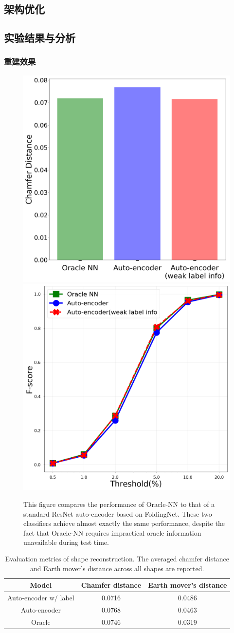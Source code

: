 \documentclass[bachelor, nocolorlinks, printoneside]{seuthesis} %
\begin{document}
\begin{Main}
\subsection{架构优化}
\subsection{实验结果与分析}
\subsubsection{重建效果}
\begin{figure}[!htb]
    \centering
    \includegraphics[width=.40\textwidth]{figs/chamfer-compare.png}
    \includegraphics[width=.40\textwidth]{figs/F-compare.png}
    \caption{\small This figure compares the performance of Oracle-NN to that of a standard ResNet auto-encoder based on FoldingNet. These two classifiers achieve almost exactly the same performance, despite the fact that Oracle-NN requires impractical oracle information unavailable during test time.}
    \label{fig:compare-Oracle-NN}
\end{figure}

\begin{table}
    \centering
    \begin{tabular}{|c@{}|c@{}|c@{}|} \hline
    Model &  Chamfer distance   &  Earth mover's distance\\ \hline
    Auto-encoder w/ label &  0.0716  & 0.0486 \\
    Auto-encoder & 0.0768 & 0.0463 \\
    Oracle & 0.0746 & 0.0319 \\ \hline
    \end{tabular}
    \vspace{2mm}
    \caption{Evaluation metrics of shape reconstruction. The averaged chamfer distance and Earth mover's distance across all shapes are reported.}
    \label{tab:evaluation}
\end{table}


\end{Main}
\end{document}
